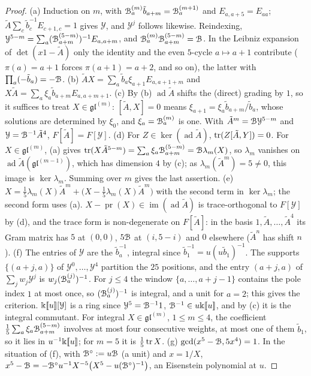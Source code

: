 \begin{proof}
(a) Induction on $m$, with $\mathcal{B}^{(m)}_a\tilde b_{a+m}=\mathcal{B}^{(m+1)}_a$ and $E_{a,a+5}=E_{aa}$; $\tilde A\sum_c\tilde b_c^{-1}E_{c+1,c}=1$ gives $\mathcal Y$, and $\mathcal Y^j$ follows likewise. Reindexing, $\mathcal Y^{5-m}=\sum_a(\mathcal{B}^{(5-m)}_{a+m})^{-1}E_{a,a+m}$, and $\mathcal{B}^{(m)}_a\mathcal{B}^{(5-m)}_{a+m}=\mathcal{B}$. In the Leibniz expansion of $\det(x1-\tilde A)$ only the identity and the even $5$-cycle $a\mapsto a+1$ contribute ($\pi(a)=a+1$ forces $\pi(a+1)=a+2$, and so on), the latter with $\prod_a(-\tilde b_a)=-\mathcal{B}$.
(b) $\tilde AX=\sum_a\tilde b_a\xi_{a+1}E_{a,a+1+m}$ and $X\tilde A=\sum_a\xi_a\tilde b_{a+m}E_{a,a+m+1}$.
(c) By (b) $\operatorname{ad}\tilde A$ shifts the (direct) grading by $1$, so it suffices to treat $X\in\mathfrak{gl}^{(m)}$: $[\tilde A,X]=0$ means $\xi_{a+1}=\xi_a\tilde b_{a+m}/\tilde b_a$, whose solutions are determined by $\xi_0$, and $\xi_a=\mathcal{B}^{(m)}_a$ is one. With $\tilde A^m=\mathcal{B}\mathcal Y^{5-m}$ and $\mathcal Y=\mathcal{B}^{-1}\tilde A^4$, $F[\tilde A]=F[\mathcal Y]$.
(d) For $Z\in\ker(\operatorname{ad}\tilde A)$, $\operatorname{tr}(Z[\tilde A,Y])=0$. For $X\in\mathfrak{gl}^{(m)}$, (a) gives $\operatorname{tr}(X\tilde A^{5-m})=\sum_a\xi_a\mathcal{B}^{(5-m)}_{a+m}=\mathcal{B}\lambda_m(X)$, so $\lambda_m$ vanishes on $\operatorname{ad}\tilde A(\mathfrak{gl}^{(m-1)})$, which has dimension $4$ by (c); as $\lambda_m(\tilde A^m)=5\neq0$, this image is $\ker\lambda_m$. Summing over $m$ gives the last assertion.
(e) $X=\frac15\lambda_m(X)\tilde A^m+\bigl(X-\frac15\lambda_m(X)\tilde A^m\bigr)$ with the second term in $\ker\lambda_m$; the second form uses (a). $X-\operatorname{pr}(X)\in\operatorname{im}(\operatorname{ad}\tilde A)$ is trace-orthogonal to $F[\mathcal Y]$ by (d), and the trace form is non-degenerate on $F[\tilde A]$: in the basis $1,\tilde A,\dots,\tilde A^4$ its Gram matrix has $5$ at $(0,0)$, $5\mathcal{B}$ at $(i,5-i)$ and $0$ elsewhere ($\tilde A^n$ has shift $n$).
(f) The entries of $\mathcal Y$ are the $\tilde b_a^{-1}$, integral since $\tilde b_1^{-1}=u(u\tilde b_1)^{-1}$. The supports $\{(a+j,a)\}$ of $\mathcal Y^0,\dots,\mathcal Y^4$ partition the $25$ positions, and the entry $(a+j,a)$ of $\sum_jw_j\mathcal Y^j$ is $w_j(\mathcal{B}^{(j)}_a)^{-1}$. For $j\leq4$ the window $\{a,\dots,a+j-1\}$ contains the pole index $1$ at most once, so $(\mathcal{B}^{(j)}_a)^{-1}$ is integral, and a unit for $a=2$; this gives the criterion. $\Bbbk[\![ u ]\!][\mathcal Y]$ is a ring since $\mathcal Y^5=\mathcal{B}^{-1}1$, $\mathcal{B}^{-1}\in u\Bbbk[\![ u ]\!]$, and by (c) it is the integral commutant. For integral $X\in\mathfrak{gl}^{(m)}$, $1\leq m\leq4$, the coefficient $\frac15\sum_a\xi_a\mathcal{B}^{(5-m)}_{a+m}$ involves at most four consecutive weights, at most one of them $\tilde b_1$, so it lies in $u^{-1}\Bbbk[\![ u ]\!]$; for $m=5$ it is $\frac15\operatorname{tr} X$.
(g) $\gcd(x^5-\mathcal{B},5x^4)=1$. In the situation of (f), with $\mathcal{B}^\circ:=u\mathcal{B}$ (a unit) and $x=1/X$, $x^5-\mathcal{B}=-\mathcal{B}^\circ u^{-1}X^{-5}\bigl(X^5-u(\mathcal{B}^\circ)^{-1}\bigr)$, an Eisenstein polynomial at $u$.
\end{proof}

